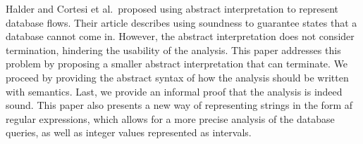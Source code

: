 
Halder and Cortesi et al.\ proposed using abstract interpretation to represent database flows.
Their article describes using soundness to guarantee states that a database cannot come in.
However, the abstract interpretation does not consider termination, hindering the usability of the analysis.
This paper addresses this problem by proposing a smaller abstract interpretation that can terminate.
We proceed by providing the abstract syntax of how the analysis should be written with semantics.
Last, we provide an informal proof that the analysis is indeed sound.
This paper also presents a new way of representing strings in the form af regular expressions, which allows for a more precise analysis of the database queries, as well as integer values represented as intervals.